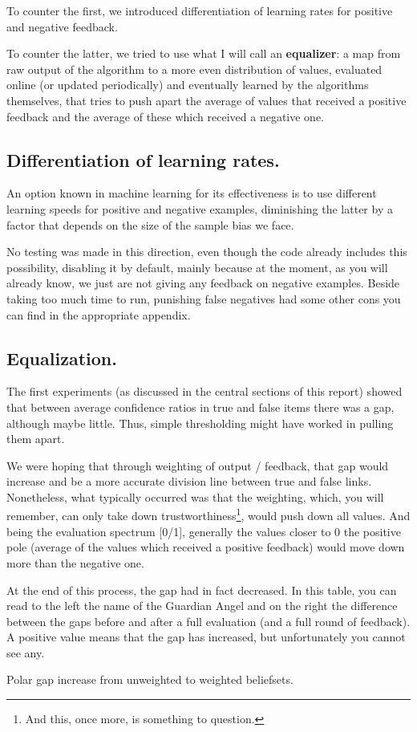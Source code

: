 \documentclass[11pt]{article}
\begin{document}
To counter the first, we introduced differentiation of learning rates for positive and negative feedback.

To counter the latter, we tried to use what I will call an \textbf{equalizer}: a map from raw output of the algorithm to a more even distribution of values, evaluated online (or updated periodically) and eventually learned by the algorithms themselves, that tries to push apart the average of values that received a positive feedback and the average of these which received a negative one.

\subsection{Differentiation of learning rates.}
An option known in machine learning for its effectiveness is to use different learning speeds for positive and negative examples, diminishing the latter by a factor that depends on the size of the sample bias we face.

No testing was made in this direction, even though the code already includes this possibility, disabling it by default, mainly because at the moment, as you will already know, we just are not giving any feedback on negative examples. Beside taking too much time to run, punishing false negatives had some other cons you can find in the appropriate appendix.

\subsection{Equalization.}
The first experiments (as discussed in the central sections of this report) showed that between average confidence ratios in true and false items there was a gap, although maybe little. Thus, simple thresholding might have worked in pulling them apart.

We were hoping that through weighting of output / feedback, that gap would increase and be a more accurate division line between true and false links. Nonetheless, what typically occurred was that the weighting, which, you will remember, can only take down trustworthiness\footnote{And this, once more, is something to question.}, would push down all values. And being the evaluation spectrum [0/1], generally the values closer to 0 the positive pole (average of the values which received a positive feedback) would move down more than the negative one.

At the end of this process, the gap had in fact decreased. In this table, you can read to the left the name of the Guardian Angel and on the right the difference between the gaps before and after a full evaluation (and a full round of feedback). A positive value means that the gap has increased, but unfortunately you cannot see any. 
\vspace{5pt}
\begin{center}Polar gap increase from unweighted to weighted beliefsets.\end{center}
\end{document}
